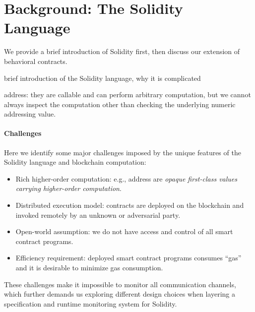 \section{Background: The Solidity Language}

We provide a brief introduction of Solidity first, then discuss our extension
of behavioral contracts.

brief introduction of the Solidity language, why it is complicated

address: they are callable and can perform arbitrary computation, but we cannot always
inspect the computation other than checking the underlying numeric addressing value.

\paragraph{Challenges}
Here we identify some major challenges imposed by the unique features of the
Solidity language and blockchain computation:

\begin{itemize}
  \item Rich higher-order computation:
    e.g., address are \emph{opaque first-class values carrying higher-order
    computation}.
  \item Distributed execution model:
    contracts are deployed on the blockchain and invoked remotely by an unknown
    or adversarial party.
  \item Open-world assumption:
    we do not have access and control of all smart contract programs.
  \item Efficiency requirement:
    deployed smart contract programs consumes ``gas'' and it is desirable
    to minimize gas consumption.
\end{itemize}

These challenges make it impossible to monitor all communication channels,
which further demands us exploring different design choices when layering
a specification and runtime monitoring system for Solidity.


